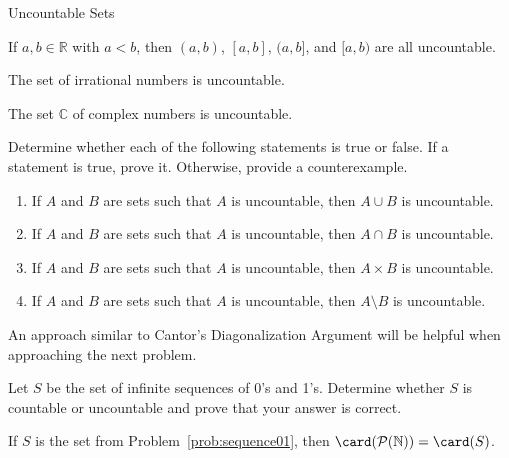 \begin{section}{Uncountable Sets}
\begin{theorem}
If $a,b\in\mathbb{R}$ with $a<b$, then $(a,b)$, $[a,b]$, $(a,b]$, and $[a,b)$ are all uncountable.
\end{theorem}


\begin{theorem}
The set of irrational numbers is uncountable.
\end{theorem}

\begin{theorem}
The set $\mathbb{C}$ of complex numbers is uncountable.
\end{theorem}

\begin{problem}
Determine whether each of the following statements is true or false. If a statement is true, prove it.  Otherwise, provide a counterexample.
\begin{enumerate}[label=\textrm{(\alph*)}]
\item If $A$ and $B$ are sets such that $A$ is uncountable, then $A\cup B$ is uncountable.
\item If $A$ and $B$ are sets such that $A$ is uncountable, then $A\cap B$ is uncountable.
\item If $A$ and $B$ are sets such that $A$ is uncountable, then $A\times B$ is uncountable.
\item If $A$ and $B$ are sets such that $A$ is uncountable, then $A\setminus B$ is uncountable.
\end{enumerate}
\end{problem}

An approach similar to Cantor's Diagonalization Argument will be helpful when approaching the next problem. 

\begin{problem}\label{prob:sequence01} 
Let $S$ be the set of infinite sequences of 0's and 1's. Determine whether $S$ is countable or uncountable and prove that your answer is correct. 
\end{problem}

\begin{theorem}
If $S$ is the set from Problem~\ref{prob:sequence01}, then $\card(\mathcal{P}(\mathbb{N}))=\card(S)$.
\end{theorem}


\end{section}
